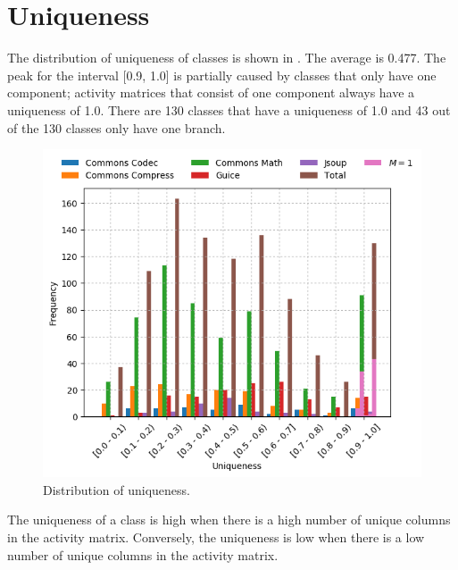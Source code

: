 \documentclass[twoside,a4paper,11pt]{memoir}
\begin{document}
\section{Uniqueness}

The distribution of uniqueness of classes is shown in .
The average is 0.477.
The peak for the interval [0.9, 1.0] is partially caused by classes that only have one component; activity matrices that consist of one component always have a uniqueness of 1.0.
There are 130 classes that have a uniqueness of 1.0 and 43 out of the 130 classes only have one branch.

\begin{figure}
    \centering
    \includegraphics[width=\linewidth]{figures/grouped_barchart_uniqueness}
    \caption{Distribution of uniqueness.}%
    \label{fig:uniqueness}
\end{figure}

The uniqueness of a class is high when there is a high number of unique columns in the activity matrix.
Conversely, the uniqueness is low when there is a low number of unique columns in the activity matrix.
\end{document}
